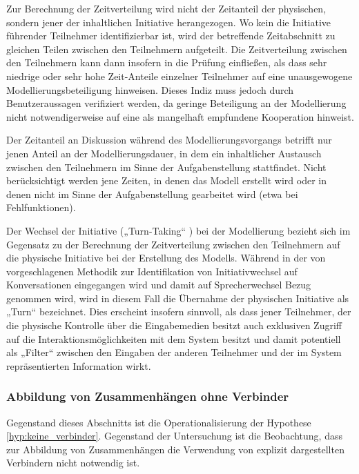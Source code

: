 Zur Berechnung der Zeitverteilung wird nicht der Zeitanteil der physischen, sondern jener der inhaltlichen Initiative herangezogen. Wo kein die Initiative führender Teilnehmer identifizierbar ist, wird der betreffende Zeitabschnitt zu gleichen Teilen zwischen den Teilnehmern aufgeteilt. Die Zeitverteilung zwischen den Teilnehmern kann dann insofern in die Prüfung einfließen, als dass sehr niedrige oder sehr hohe Zeit-Anteile einzelner Teilnehmer auf eine unausgewogene Modellierungsbeteiligung hinweisen. Dieses Indiz muss jedoch durch Benutzeraussagen verifiziert werden, da geringe Beteiligung an der Modellierung nicht notwendigerweise auf eine als mangelhaft empfundene Kooperation hinweist.

Der Zeitanteil an Diskussion während des Modellierungsvorgangs betrifft nur jenen Anteil an der Modellierungsdauer, in dem ein inhaltlicher Austausch zwischen den Teilnehmern im Sinne der Aufgabenstellung stattfindet. Nicht berücksichtigt werden jene Zeiten, in denen das Modell erstellt wird oder in denen nicht im Sinne der Aufgabenstellung gearbeitet wird (etwa bei Fehlfunktionen).

Der Wechsel der Initiative („Turn-Taking“ \citep{Sacks74}) bei der Modellierung bezieht sich im Gegensatz zu der Berechnung der Zeitverteilung zwischen den Teilnehmern auf die physische Initiative bei der Erstellung des Modells. Während in der von \citet{Sacks74} vorgeschlagenen Methodik zur Identifikation von Initiativwechsel auf Konversationen eingegangen wird und damit auf Sprecherwechsel Bezug genommen wird, wird in diesem Fall die Übernahme der physischen Initiative als „Turn“ bezeichnet. Dies erscheint insofern sinnvoll, als dass jener Teilnehmer, der die physische Kontrolle über die Eingabemedien besitzt auch exklusiven Zugriff auf die Interaktionsmöglichkeiten mit dem System besitzt und damit potentiell als „Filter“ zwischen den Eingaben der anderen Teilnehmer und der im System repräsentierten Information wirkt.


\subsubsection{Abbildung von Zusammenhängen ohne Verbinder} %
\label{ssub:abbildung_von_zusammenhängen_ohne_verbinder}

Gegenstand dieses Abschnitts ist die Operationalisierung der Hypothese \ref{hyp:keine_verbinder}. Gegenstand der Untersuchung ist die Beobachtung, dass zur Abbildung von Zusammenhängen die Verwendung von explizit dargestellten Verbindern nicht notwendig ist.

